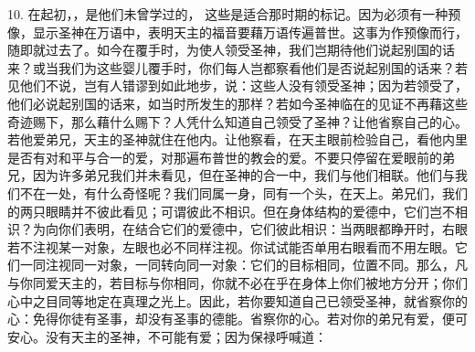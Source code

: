 10. 在起初，，是他们未曾学过的， 这些是适合那时期的标记。因为必须有一种预像，显示圣神在万语中，表明天主的福音要藉万语传遍普世。这事为作预像而行，随即就过去了。如今在覆手时，为使人领受圣神，我们岂期待他们说起别国的话来？或当我们为这些婴儿覆手时，你们每人岂都察看他们是否说起别国的话来？若见他们不说，岂有人错谬到如此地步，说：这些人没有领受圣神；因为若领受了，他们必说起别国的话来，如当时所发生的那样？若如今圣神临在的见证不再藉这些奇迹赐下，那么藉什么赐下？人凭什么知道自己领受了圣神？让他省察自己的心。若他爱弟兄，天主的圣神就住在他内。让他察看，在天主眼前检验自己，看他内里是否有对和平与合一的爱，对那遍布普世的教会的爱。不要只停留在爱眼前的弟兄，因为许多弟兄我们并未看见，但在圣神的合一中，我们与他们相联。他们与我们不在一处，有什么奇怪呢？我们同属一身，同有一个头，在天上。弟兄们，我们的两只眼睛并不彼此看见；可谓彼此不相识。但在身体结构的爱德中，它们岂不相识？为向你们表明，在结合它们的爱德中，它们彼此相识：当两眼都睁开时，右眼若不注视某一对象，左眼也必不同样注视。你试试能否单用右眼看而不用左眼。它们一同注视同一对象，一同转向同一对象：它们的目标相同，位置不同。那么，凡与你同爱天主的，若目标与你相同，你就不必在乎在身体上你们被地方分开；你们心中之目同等地定在真理之光上。因此，若你要知道自己已领受圣神，就省察你的心：免得你徒有圣事，却没有圣事的德能。省察你的心。若对你的弟兄有爱，便可安心。没有天主的圣神，不可能有爱；因为保禄呼喊道：\par

